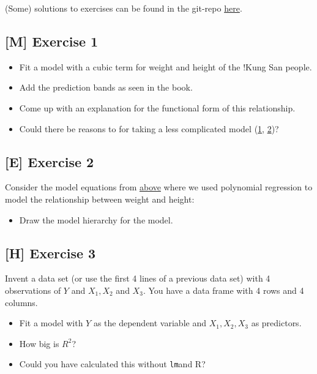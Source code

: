 \documentclass[
]{book}
\providecommand{\tightlist}{%
  \setlength{\itemsep}{0pt}\setlength{\parskip}{0pt}}
\begin{document}
(Some) solutions to exercises can be found in the git-repo \href{https://github.com/jdegenfellner/Script_QM2_ZHAW/tree/main/Solutions_Exercises}{here}.

\subsection{{[}M{]} Exercise 1}\label{exercise1_multiple_regression}

\begin{itemize}
\tightlist
\item
  Fit a model with a cubic term for weight and height of the !Kung San people.
\item
  Add the prediction bands as seen in the book.
\item
  Come up with an explanation for the functional form of this relationship.
\item
  Could there be reasons to for taking a less complicated model
  (\href{https://en.wikipedia.org/wiki/Statistical_model_specification}{1}, \href{https://en.wikipedia.org/wiki/Occam\%27s_razor}{2})?
\end{itemize}

\subsection{{[}E{]} Exercise 2}\label{exercise2_multiple_regression}

Consider the model equations from \hyperref[adding_transformed_predictor_bayes]{above}
where we used polynomial regression to model the relationship between
weight and height:

\begin{itemize}
\tightlist
\item
  Draw the model hierarchy for the model.
\end{itemize}

\subsection{{[}H{]} Exercise 3}\label{exercise3_multiple_regression}

Invent a data set (or use the first 4 lines of a previous data set)
with 4 observations of \(Y\) and \(X_1, X_2\) and \(X_3\). You have a data frame
with 4 rows and 4 columns.

\begin{itemize}
\tightlist
\item
  Fit a model with \(Y\) as the dependent variable and \(X_1, X_2, X_3\) as predictors.
\item
  How big is \(R^2\)?
\item
  Could you have calculated this without \texttt{lm}and R?
\end{itemize}
\end{document}

